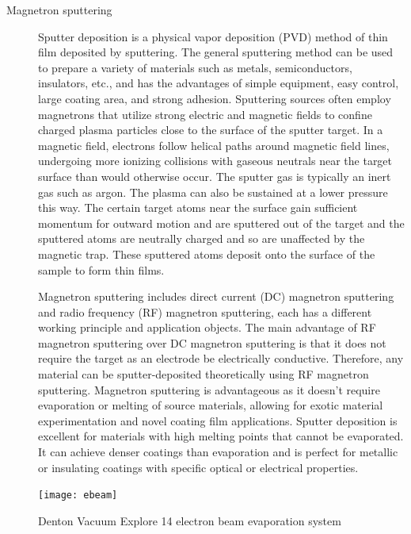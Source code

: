 \begin{description}
	\item[Magnetron sputtering]
	
Sputter deposition  is a physical vapor deposition (PVD) method of thin film deposited by sputtering. The general sputtering method can be used to prepare a variety of materials such as metals, semiconductors, insulators, etc., and has the advantages of simple equipment, easy control, large coating area, and strong adhesion. Sputtering sources often employ magnetrons that utilize strong electric and magnetic fields to confine charged plasma particles close to the surface of the sputter target. In a magnetic field, electrons follow helical paths around magnetic field lines, undergoing more ionizing collisions with gaseous neutrals near the target surface than would otherwise occur. The sputter gas is typically an inert gas such as argon. The plasma can also be sustained at a lower pressure this way.  The certain target atoms near the surface gain sufficient momentum for outward motion and are sputtered out of the target and the sputtered atoms are neutrally charged and so are unaffected by the magnetic trap. These sputtered atoms deposit onto the surface  of the sample to form thin films.

Magnetron sputtering  includes direct current (DC) magnetron sputtering and radio frequency (RF) magnetron sputtering, each has a different working principle and application objects. The main advantage of RF magnetron sputtering over DC magnetron sputtering is that it does not require the target as an electrode be electrically conductive. Therefore, any material can be sputter-deposited theoretically using RF magnetron sputtering. Magnetron sputtering is advantageous as it doesn’t require evaporation or melting of source materials, allowing for exotic material experimentation and novel coating film applications. Sputter deposition is excellent for materials with high melting points that cannot be evaporated. It can achieve denser coatings than evaporation and is perfect for metallic or insulating coatings with specific optical or electrical properties.

\end{description}

\begin{figure}[H] 
\centering    
\texttt{[image: ebeam]}
\caption[Denton Vacuum Explore 14 electron beam evaporation system]{Denton Vacuum Explore 14 electron beam evaporation system}
\label{fig:ebeam}
\end{figure}


